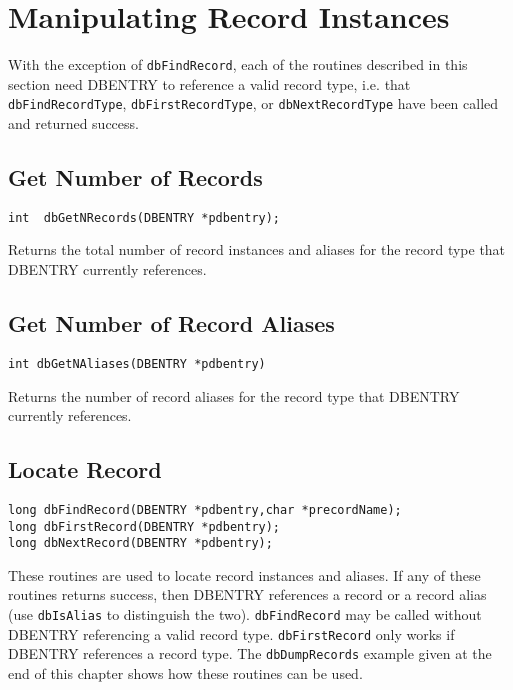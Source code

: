 \section{Manipulating Record Instances}

With the exception of \verb|dbFindRecord|, each of the routines described in this section need DBENTRY to reference a valid record type, i.e. that \verb|dbFindRecordType|, \verb|dbFirstRecordType|, or \verb|dbNextRecordType| have been called and returned success.

\subsection{Get Number of Records}

\begin{verbatim}
int  dbGetNRecords(DBENTRY *pdbentry);
\end{verbatim}

Returns the total number of record instances and aliases for the record type that DBENTRY currently references.

\subsection{Get Number of Record Aliases}

\begin{verbatim}
int dbGetNAliases(DBENTRY *pdbentry)
\end{verbatim}

Returns the number of record aliases for the record type that DBENTRY currently references.

\subsection{Locate Record}

\begin{verbatim}
long dbFindRecord(DBENTRY *pdbentry,char *precordName);
long dbFirstRecord(DBENTRY *pdbentry);
long dbNextRecord(DBENTRY *pdbentry);
\end{verbatim}

These routines are used to locate record instances and aliases.
If any of these routines returns success, then DBENTRY references a record or a record alias (use \verb|dbIsAlias| to distinguish the two).
\verb|dbFindRecord| may be called without DBENTRY referencing a valid record type.
\verb|dbFirstRecord| only works if DBENTRY references a record type.
The \verb|dbDumpRecords| example given at the end of this chapter shows how these routines can be used.

